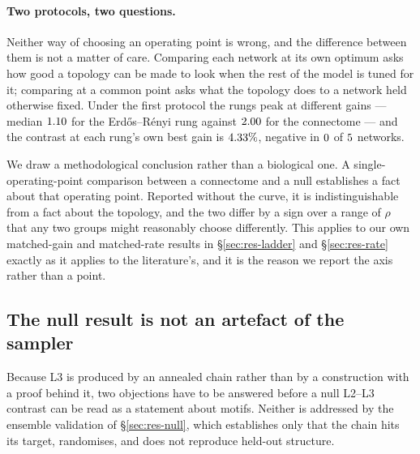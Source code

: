 \paragraph{Two protocols, two questions.}
Neither way of choosing an operating point is wrong, and the difference between them is
not a matter of care. Comparing each network at its own optimum asks how good a topology
can be made to look when the rest of the model is tuned for it; comparing at a common
point asks what the topology does to a network held otherwise fixed. Under the first
protocol the rungs peak at different gains --- median $1.10$ for the
Erd\H{o}s--R\'enyi rung against $2.00$ for the connectome --- and the contrast at
each rung's own best gain is $4.33\%$, negative in
$0$ of $5$ networks.

We draw a methodological conclusion rather than a biological one. A single-operating-point
comparison between a connectome and a null establishes a fact about that operating point.
Reported without the curve, it is indistinguishable from a fact about the topology, and
the two differ by a sign over a range of $\rho$ that any two groups might reasonably
choose differently. This applies to our own matched-gain and matched-rate results in
\S\ref{sec:res-ladder} and \S\ref{sec:res-rate} exactly as it applies to the literature's,
and it is the reason we report the axis rather than a point.

\subsection{The null result is not an artefact of the sampler}
\label{sec:res-robust}

Because L3 is produced by an annealed chain rather than by a construction with a proof
behind it, two objections have to be answered before a null L2--L3 contrast can be read
as a statement about motifs. Neither is addressed by the ensemble validation of
\S\ref{sec:res-null}, which establishes only that the chain hits its target,
randomises, and does not reproduce held-out structure.

